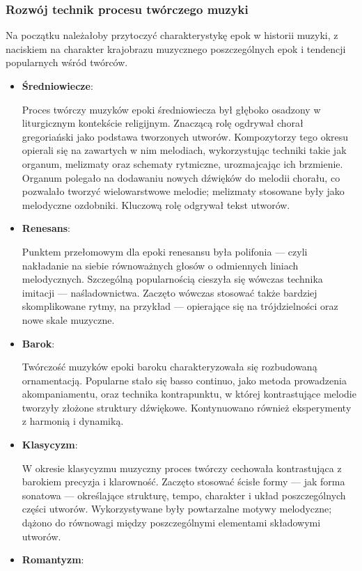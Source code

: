 \documentclass[12pt]{article}
\begin{document}
\subsubsection{Rozwój technik procesu twórczego muzyki}
Na początku należałoby przytoczyć charakterystykę epok w historii muzyki, z naciskiem na charakter krajobrazu muzycznego
poszczególnych epok i tendencji popularnych wśród twórców.
\begin{itemize}
	\item \textbf{Średniowiecze}:
	      
	      Proces twórczy muzyków epoki średniowiecza był głęboko osadzony w liturgicznym kontekście religijnym.
	      Znaczącą rolę ogdrywał chorał gregoriański jako podstawa tworzonych utworów.
	      Kompozytorzy tego okresu opierali się na zawartych w nim melodiach, wykorzystując techniki takie jak organum,
	      melizmaty oraz schematy rytmiczne, urozmajcając ich brzmienie.
	      Organum polegało na dodawaniu nowych dźwięków do melodii chorału, co pozwalało tworzyć wielowarstwowe melodie;
	      melizmaty stosowane były jako melodyczne ozdobniki. Kluczową rolę odgrywał tekst utworów.
	\item \textbf{Renesans}:
	      
	      Punktem przełomowym dla epoki renesansu była polifonia — czyli nakładanie na siebie równoważnych głosów o
	      odmiennych liniach melodycznych.
	      Szczególną popularnością cieszyła się wówczas technika imitacji — naśladownictwa.
	      Zaczęto wówczas stosować także bardziej skomplikowane rytmy, na przykład — opierające się na trójdzielności
	      oraz nowe skale muzyczne.
	\item \textbf{Barok}:
	      
	      Twórczość muzyków epoki baroku charakteryzowała się rozbudowaną ornamentacją.
	      Popularne stało się basso continuo, jako metoda prowadzenia akompaniamentu, oraz technika kontrapunktu,
	      w której kontrastujące melodie tworzyły złożone struktury dźwiękowe.
	      Kontynuowano również eksperymenty z harmonią i dynamiką.
	\item \textbf{Klasycyzm}:
	      
	      W okresie klasycyzmu muzyczny proces twórczy cechowała kontrastująca z barokiem precyzja i klarowność.
	      Zaczęto stosować ścisłe formy — jak forma sonatowa — określające strukturę, tempo,
	      charakter i układ poszczególnych części utworów.
	      Wykorzystywane były powtarzalne motywy melodyczne; dążono do równowagi między poszczególnymi elementami składowymi utworów.
	\item \textbf{Romantyzm}:
	      

\end{itemize}
\end{document}
